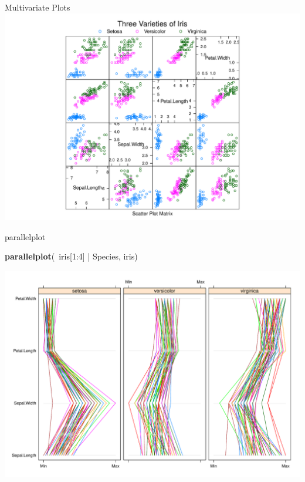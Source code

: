 \documentclass[ignorenonframetext,]{beamer}
\newenvironment{Shaded}{}{}
\newcommand{\KeywordTok}[1]{\textcolor[rgb]{0.00,0.44,0.13}{\textbf{{#1}}}}
\newcommand{\DecValTok}[1]{\textcolor[rgb]{0.25,0.63,0.44}{{#1}}}
\newcommand{\StringTok}[1]{\textcolor[rgb]{0.25,0.44,0.63}{{#1}}}
\newcommand{\NormalTok}[1]{{#1}}
\begin{document}
\begin{frame}[fragile]{Multivariate Plots}
\includegraphics{R_intern_files/figure-beamer/unnamed-chunk-235-1.pdf}

\end{frame}

\begin{frame}[fragile]{parallelplot}

\begin{Shaded}
\begin{Highlighting}[]
\KeywordTok{parallelplot}\NormalTok{(~iris[}\DecValTok{1}\NormalTok{:}\DecValTok{4}\NormalTok{] |}\StringTok{ }\NormalTok{Species, iris)}
\end{Highlighting}
\end{Shaded}

\includegraphics{R_intern_files/figure-beamer/unnamed-chunk-236-1.pdf}

\end{frame}
\end{document}
